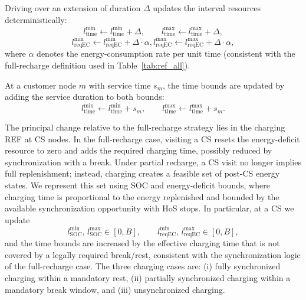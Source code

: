 \documentclass[trsc,dblanonrev]{informs4}
\begin{document}
Driving over an extension of duration \(\Delta\) updates the interval resources deterministically:
\begin{equation}
l_{\text{time}}^{\min} \leftarrow l_{\text{time}}^{\min} + \Delta, \qquad
l_{\text{time}}^{\max} \leftarrow l_{\text{time}}^{\max} + \Delta,
\label{eq:pr_time_drive}
\end{equation}
\begin{equation}
l_{\text{reqEC}}^{\min} \leftarrow l_{\text{reqEC}}^{\min} + \Delta \cdot \alpha,
l_{\text{reqEC}}^{\max} \leftarrow l_{\text{reqEC}}^{\max} + \Delta \cdot \alpha,
\label{eq:pr_reqec_drive}
\end{equation}
where \(\alpha\) denotes the energy-consumption rate per unit time (consistent with the full-recharge definition used in Table~\ref{tab:ref_all}).

At a customer node \(m\) with service time \(s_m\), the time bounds are updated by adding the service duration to both bounds:
\begin{equation}
l_{\text{time}}^{\min} \leftarrow l_{\text{time}}^{\min} + s_m,
\qquad
l_{\text{time}}^{\max} \leftarrow l_{\text{time}}^{\max} + s_m.
\label{eq:pr_visit}
\end{equation}

The principal change relative to the full-recharge strategy lies in the charging REF at CS nodes. In the full-recharge case, visiting a CS resets the energy-deficit resource to zero and adds the required charging time, possibly reduced by synchronization with a break. Under partial recharge, a CS visit no longer implies full replenishment; instead, charging creates a feasible set of post-CS energy states. We represent this set using SOC and energy-deficit bounds, where charging time is proportional to the energy replenished and bounded by the available synchronization opportunity with HoS stops. In particular, at a CS we update
\begin{equation}
l_{\text{SOC}}^{\min},\, l_{\text{SOC}}^{\max} \in [0,B],
\qquad
l_{\text{reqEC}}^{\min},\, l_{\text{reqEC}}^{\max} \in [0,B],
\label{eq:pr_cs_bounds}
\end{equation}
and the time bounds are increased by the effective charging time that is not covered by a legally required break/rest, consistent with the synchronization logic of the full-recharge case. The three charging cases are:
(i) fully synchronized charging within a mandatory rest,
(ii) partially synchronized charging within a mandatory break window,
and (iii) unsynchronized charging.
\end{document}
